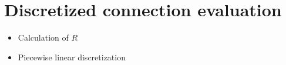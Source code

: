 \documentclass[../thesis.tex]{subfiles}
\begin{document}
\chapter{Discretized connection evaluation}
\begin{itemize}
  \item Calculation of $R$
  \item Piecewise linear discretization
\end{itemize}
\end{document}
